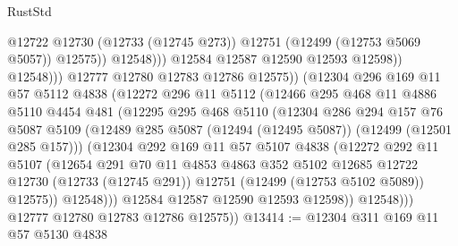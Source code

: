 \begin{lexlean}{RustStd}
\begin{coremodule}
{\begin{coremodule}
{{{{{{{{{{{{{{{{{{{{{{{{{{{{{{{{{{{{{{{{{{{{{{{{{{{{{{{{{{{{{{{{{{{{{{{{{{{{{{{{                                    @12722
                                    @12730
                                    (@12733 (@12745 @273))
                                    @12751
                                    (@12499 (@12753 @5069 @5057))
                                    @12575))
                                @12548)))
                          @12584
                          @12587
                          @12590
                          @12593
                          @12598))
                      @12548)))
                @12777
                @12780
                @12783
                @12786
                @12575))
            (@12304
              @296
              @169
              @11
              @57
              @5112
              @4838
              (@12272
                @296
                @11
                @5112
                (@12466
                  @295
                  @468
                  @11
                  @4886
                  @5110
                  @4454
                  @481
                  (@12295
                    @295
                    @468
                    @5110
                    (@12304
                      @286
                      @294
                      @157
                      @76
                      @5087
                      @5109
                      (@12489 @285 @5087 (@12494 (@12495 @5087)) (@12499 (@12501 @285 @157)))
                      (@12304
                        @292
                        @169
                        @11
                        @57
                        @5107
                        @4838
                        (@12272
                          @292
                          @11
                          @5107
                          (@12654
                            @291
                            @70
                            @11
                            @4853
                            @4863
                            @352
                            @5102
                            @12685
                            @12722
                            @12730
                            (@12733 (@12745 @291))
                            @12751
                            (@12499 (@12753 @5102 @5089))
                            @12575))
                        @12548)))
                  @12584
                  @12587
                  @12590
                  @12593
                  @12598))
              @12548)))
        @12777
        @12780
        @12783
        @12786
        @12575))
@13414 := @12304 @311 @169 @11 @57 @5130 @4838
}}}}}}}}}}}}}}}}}}}}}}}}}}}}}}}}}}}}}}}}}}}}}}}}}}}}}}}}}}}}}}}}}}}}}}}}}}}}}}}}
\end{coremodule}}
\end{coremodule}
\end{lexlean}
